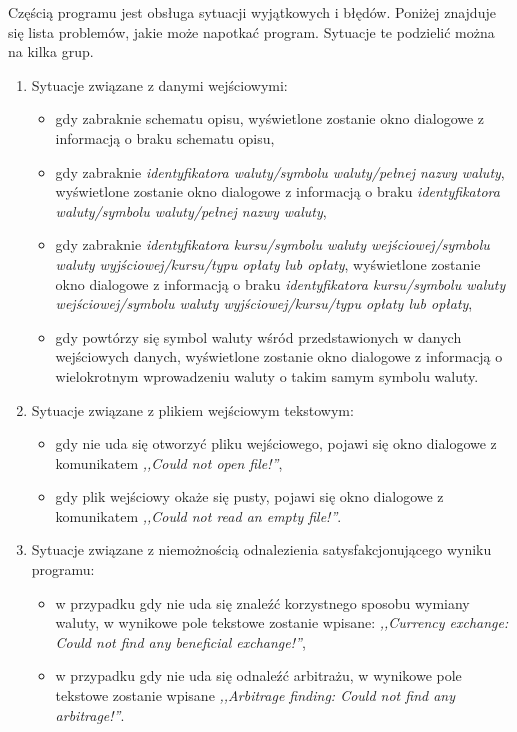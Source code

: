 \documentclass[a4paper,12pt]{article}
\newcommand\tab[1][0.6cm]{\hspace*{#1} }
\begin{document}
\tab Częścią programu jest obsługa sytuacji wyjątkowych i błędów. Poniżej znajduje się lista problemów, jakie może napotkać program. Sytuacje te podzielić można na kilka grup.
\\\begin{enumerate}
\item Sytuacje związane z danymi wejściowymi:
\begin{itemize}
\item gdy zabraknie schematu opisu, wyświetlone zostanie okno dialogowe z informacją o braku schematu opisu,
\item gdy zabraknie \textit{identyfikatora waluty/symbolu waluty/pełnej nazwy waluty}, wyświetlone zostanie okno dialogowe z informacją o braku \textit{identyfikatora waluty/symbolu waluty/pełnej nazwy waluty},
\item gdy zabraknie \textit{identyfikatora kursu/symbolu waluty wejściowej/symbolu waluty wyjściowej/kursu/typu opłaty lub opłaty}, wyświetlone zostanie okno dialogowe z informacją o braku \textit{identyfikatora kursu/symbolu waluty wejściowej/symbolu waluty wyjściowej/kursu/typu opłaty lub opłaty},
\item gdy powtórzy się symbol waluty wśród przedstawionych w danych wejściowych danych, wyświetlone zostanie okno dialogowe z informacją o wielokrotnym wprowadzeniu waluty o takim samym symbolu waluty.
\end{itemize}
\item Sytuacje związane z plikiem wejściowym tekstowym:
\begin{itemize}
\item gdy nie uda się otworzyć pliku wejściowego, pojawi się okno dialogowe z komunikatem \textit{,,Could not open file!''},
\item gdy plik wejściowy okaże się pusty, pojawi się okno dialogowe z komunikatem \textit{,,Could not read an empty file!''}.
\end{itemize}
\item Sytuacje związane z niemożnością odnalezienia satysfakcjonującego wyniku programu:
\begin{itemize}
\item w przypadku gdy nie uda się znaleźć korzystnego sposobu wymiany waluty, w wynikowe pole tekstowe zostanie wpisane: \textit{,,Currency exchange: Could not find any beneficial exchange!''},
\item w przypadku gdy nie uda się odnaleźć arbitrażu, w wynikowe pole tekstowe zostanie wpisane \textit{,,Arbitrage finding: Could not find any arbitrage!''}.
\end{itemize}
\end{enumerate}
\end{document}
